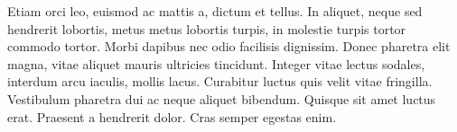 Etiam orci leo, euismod ac mattis a, dictum et tellus. In aliquet, neque sed hendrerit lobortis, metus metus lobortis turpis, in molestie turpis tortor commodo tortor. Morbi dapibus nec odio facilisis dignissim. Donec pharetra elit magna, vitae aliquet mauris ultricies tincidunt. Integer vitae lectus sodales, interdum arcu iaculis, mollis lacus. Curabitur luctus quis velit vitae fringilla. Vestibulum pharetra dui ac neque aliquet bibendum. Quisque sit amet luctus erat. Praesent a hendrerit dolor. Cras semper egestas enim.
